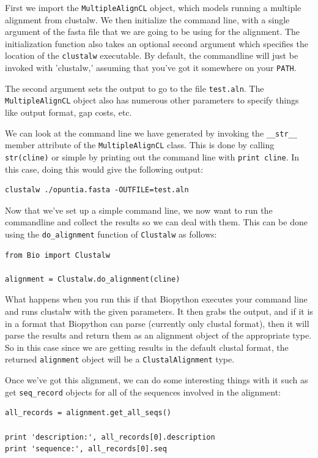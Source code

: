 \documentclass{report}
\begin{document}
First we import the \verb|MultipleAlignCL| object, which models running a multiple alignment from clustalw. We then initialize the command line, with a single argument of the fasta file that we are going to be using for the alignment. The initialization function also takes an optional second argument which specifies the location of the \verb|clustalw| executable. By default, the commandline will just be invoked with 'clustalw,' assuming that you've got it somewhere on your \verb|PATH|.


The second argument sets the output to go to the file \verb|test.aln|. The \verb|MultipleAlignCL| object also has numerous other parameters to specify things like output format, gap costs, etc. 


We can look at the command line we have generated by invoking the \verb|__str__| member attribute of the \verb|MultipleAlignCL| class. This is done by calling \verb|str(cline)| or simple by printing out the command line with \verb|print cline|. In this case, doing this would give the following output:

\begin{verbatim}
clustalw ./opuntia.fasta -OUTFILE=test.aln
\end{verbatim}

Now that we've set up a simple command line, we now want to run the commandline and collect the results so we can deal with them. This can be done using the \verb|do_alignment| function of \verb|Clustalw| as follows:

\begin{verbatim}
from Bio import Clustalw

alignment = Clustalw.do_alignment(cline)
\end{verbatim}

What happens when you run this if that Biopython executes your command line and runs clustalw with the given parameters. It then grabs the output, and if it is in a format that Biopython can parse (currently only clustal format), then it will parse the results and return them as an alignment object of the appropriate type. So in this case since we are getting results in the default clustal format, the returned \verb|alignment| object will be a \verb|ClustalAlignment| type.


Once we've got this alignment, we can do some interesting things with it such as get \verb|seq_record| objects for all of the sequences involved in the alignment:

\begin{verbatim}
all_records = alignment.get_all_seqs()

print 'description:', all_records[0].description
print 'sequence:', all_records[0].seq
\end{verbatim}
\end{document}
